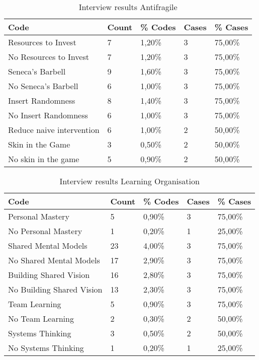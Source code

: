 \begin{table}[htbp]
	\centering
	\begin{tabular}{lllll}
		\toprule
		\textbf{Code} & \textbf{Count} & \textbf{\% Codes} & \textbf{Cases} & \textbf{\% Cases} \\
		\midrule
		Resources to Invest & 7     & 1,20\% & 3     & 75,00\% \\
		No Resources to Invest & 7     & 1,20\% & 3     & 75,00\% \\
		Seneca's Barbell & 9     & 1,60\% & 3     & 75,00\% \\
		No Seneca's Barbell & 6     & 1,00\% & 3     & 75,00\% \\
		Insert Randomness & 8     & 1,40\% & 3     & 75,00\% \\
		No Insert Randomness & 6     & 1,00\% & 3     & 75,00\% \\
		Reduce naive intervention & 6     & 1,00\% & 2     & 50,00\% \\
		Skin in the Game & 3     & 0,50\% & 2     & 50,00\% \\
		No skin in the game & 5     & 0,90\% & 2     & 50,00\% \\
		\bottomrule
	\end{tabular}%
	\caption{Interview results Antifragile}
	\label{tab:interviewresultsantifragile}%
\end{table}%

\begin{table}[htbp]
	\centering
	\begin{tabular}{lllll}
		\toprule
		\textbf{Code} & \textbf{Count} & \textbf{\% Codes} & \textbf{Cases} & \textbf{\% Cases} \\
		\midrule
		Personal Mastery & 5     & 0,90\% & 3     & 75,00\% \\
		No Personal Mastery & 1     & 0,20\% & 1     & 25,00\% \\
		Shared Mental Models & 23    & 4,00\% & 3     & 75,00\% \\
		No Shared Mental Models & 17    & 2,90\% & 3     & 75,00\% \\
		Building Shared Vision & 16    & 2,80\% & 3     & 75,00\% \\
		No Building Shared Vision & 13    & 2,30\% & 3     & 75,00\% \\
		Team Learning & 5     & 0,90\% & 3     & 75,00\% \\
		No Team Learning & 2     & 0,30\% & 2     & 50,00\% \\
		Systems Thinking & 3     & 0,50\% & 2     & 50,00\% \\
		No Systems Thinking & 1     & 0,20\% & 1     & 25,00\% \\
		\bottomrule
	\end{tabular}%
	\caption{Interview results Learning Organisation}%
	\label{tab:interviewresultslearningorganisation}%
\end{table}%


